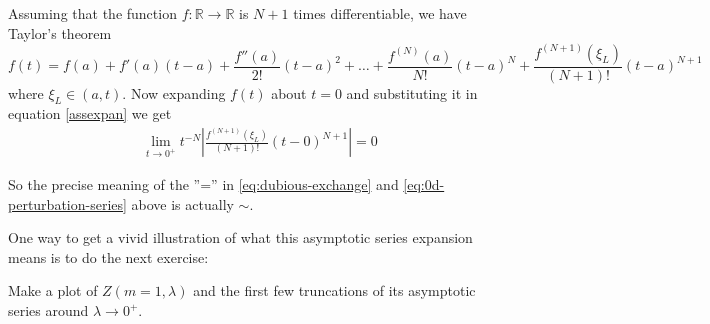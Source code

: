 \documentclass[12pt,letterpaper,reqno]{article}
\numberwithin{equation}{section}
\newcommand{\R}{\ensuremath{\mathbb R}}
\begin{document}
\begin{solution}
  Assuming that the function $f:\R\to\R$ is $N+1$ times differentiable, we have Taylor's theorem
  \begin{equation}
    f(t)= f(a) + f'(a)(t-a)  + \frac{f''(a)}{2!}(t-a)^2 + \ldots + \frac{f^{(N)}(a)}{N!}(t-a)^N + \frac{f^{(N+1)}(\xi_L)}{(N+1)!}(t-a)^{N+1}
  \end{equation}
where $\xi_L\in (a,t)$.  Now expanding $f(t)$ about $t=0$ and substituting it in equation \ref{assexpan} we get
\begin{equation}
\begin{split}
  \lim_{t\to 0^+}t^{-N}\left|\frac{f^{(N+1)}(\xi_L)}{(N+1)!}(t-0)^{N+1}\right|=0
\end{split}
\end{equation}
\end{solution}

So the precise meaning of the $\text{''=''}$ in \eqref{eq:dubious-exchange}
and \eqref{eq:0d-perturbation-series} above is actually $\sim$.

One way to get a vivid illustration of what this asymptotic series
expansion means is to do the next exercise:

\begin{exercise} Make a plot of $Z(m=1,\lambda)$
and the first few truncations of its asymptotic series around $\lambda \to 0^+$.
\end{exercise}
\end{document}

